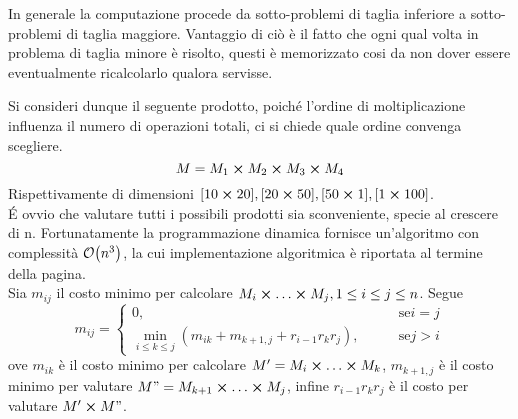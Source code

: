 \documentclass{subfiles}
\begin{document}
\noindent In generale la computazione procede da sotto-problemi di taglia inferiore a sotto-problemi di taglia maggiore.
Vantaggio di ciò è il fatto che ogni qual volta in problema di taglia minore è risolto, questi è memorizzato cosi da non dover essere eventualmente ricalcolarlo qualora servisse.

\begin{Example*}
    Si consideri dunque il seguente prodotto, poiché l'ordine di moltiplicazione influenza il numero di operazioni totali, ci si chiede quale ordine convenga scegliere.
    \[
        M = M_{1} \cp M_{2} \cp M_{3} \cp M_{4}
    \]
    \noindent Rispettivamente di dimensioni \([10 \cp 20], [20 \cp 50], [50 \cp 1], [1 \cp 100]\).
    \\
    \'E ovvio che valutare tutti i possibili prodotti sia sconveniente, specie al crescere di n.
    Fortunatamente la programmazione dinamica fornisce un'algoritmo con complessità \(\order{n^{3}}\), la cui implementazione algoritmica è riportata al termine della pagina.
    \\
    Sia \(m_{ij}\) il costo minimo per calcolare \(M_{i} \cp \ldots \cp M_{j}, 1 \le i \le j \le n\). Segue
    \[
        m_{ij} = \begin{cases}
            0, \qquad                                                                        & \text{se} i = j \\
            \min\limits_{i \le k \le j}{(m_{ik} + m_{k+1, j} + r_{i - 1}r_{k}r_{j})}, \qquad & \text{se} j > i
        \end{cases}
    \]
    \noindent ove \(m_{ik}\) è il costo minimo per calcolare \(M' = M_{i} \cp \ldots \cp M_{k}\), \(m_{k + 1, j}\) è il costo minimo per valutare \(M" = M_{k + 1} \cp \ldots \cp M_{j}\),
    infine \(r_{i - 1}r_{k}r_{j}\) è il costo per valutare \(M' \cp M"\).
    

\end{Example*}
\end{document}
